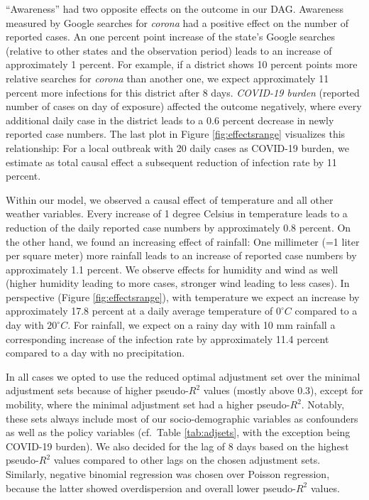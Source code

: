 \documentclass[]{elsarticle} %
\begin{document}
``Awareness'' had two opposite effects on the outcome in our DAG. Awareness measured by Google searches for \emph{corona} had a positive effect on the number of reported cases. An one percent point increase of the state's Google searches (relative to other states and the observation period) leads to an increase of approximately 1 percent. For example, if a district shows 10 percent points more relative searches for \emph{corona} than another one, we expect approximately 11 percent more infections for this district after 8 days. \emph{COVID-19 burden} (reported number of cases on day of exposure) affected the outcome negatively, where every additional daily case in the district leads to a 0.6 percent decrease in newly reported case numbers. The last plot in Figure \ref{fig:effectsrange} visualizes this relationship: For a local outbreak with 20 daily cases as COVID-19 burden, we estimate as total causal effect a subsequent reduction of infection rate by 11 percent.

Within our model, we observed a causal effect of temperature and all other weather variables. Every increase of 1 degree Celsius in temperature leads to a reduction of the daily reported case numbers by approximately 0.8 percent. On the other hand, we found an increasing effect of rainfall: One millimeter (=1 liter per square meter) more rainfall leads to an increase of reported case numbers by approximately 1.1 percent. We observe effects for humidity and wind as well (higher humidity leading to more cases, stronger wind leading to less cases). In perspective (Figure \ref{fig:effectsrange}), with temperature we expect an increase by approximately 17.8 percent at a daily average temperature of \(0^{\circ}C\) compared to a day with \(20^{\circ}C\). For rainfall, we expect on a rainy day with 10 mm rainfall a corresponding increase of the infection rate by approximately 11.4 percent compared to a day with no precipitation.

In all cases we opted to use the reduced optimal adjustment set over the minimal adjustment sets because of higher pseudo-\(R^2\) values (mostly above 0.3), except for mobility, where the minimal adjustment set had a higher pseudo-\(R^2\). Notably, these sets always include most of our socio-demographic variables as confounders as well as the policy variables (cf.~Table \ref{tab:adjsets}, with the exception being COVID-19 burden). We also decided for the lag of 8 days based on the highest pseudo-\(R^2\) values compared to other lags on the chosen adjustment sets. Similarly, negative binomial regression was chosen over Poisson regression, because the latter showed overdispersion and overall lower pseudo-\(R^2\) values.
\end{document}
